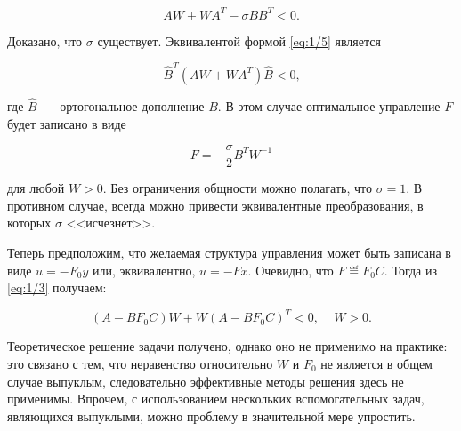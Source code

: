 \begin{equation}
\label{eq:1/5}
AW + WA^T - \sigma BB^T < 0\mbox{.}
\end{equation}

Доказано, что $\sigma$ существует. Эквивалентой формой \vref{eq:1/5} является

$$
\hat{B}^T(AW+WA^T)\hat{B} < 0\mbox{,}
$$

\begin{flushleft}
где $\hat{B}$~--- ортогональное дополнение $B$. В этом случае оптимальное управление $F$ будет записано в виде
\end{flushleft}

\begin{equation}
\label{eq:1/6}
F = -\frac{\sigma}{2}B^TW^{-1}
\end{equation}

\begin{flushleft}
для любой $W>0$. Без ограничения общности можно полагать, что $\sigma=1$. В противном случае, всегда можно привести эквивалентные преобразования, в которых $\sigma$ <<исчезнет>>.\br
\end{flushleft}

Теперь предположим, что желаемая структура управления может быть записана в виде $u=-F_0y$ или, эквивалентно, $u=-Fx$. Очевидно, что $F \eqdef F_0C$. Тогда из \vref{eq:1/3} получаем:

\begin{equation}
\label{eq:1/7}
(A-BF_0C)W + W(A-BF_0C)^T < 0\mbox{,}~~~~~~W>0\mbox{.}
\end{equation}

Теоретическое решение задачи получено, однако оно не применимо на практике: это связано с тем, что неравенство относительно $W$ и $F_0$ не является в общем случае выпуклым, следовательно эффективные методы решения здесь не применимы. Впрочем, с использованием нескольких вспомогательных задач, являющихся выпуклыми, можно проблему в значительной мере упростить.
